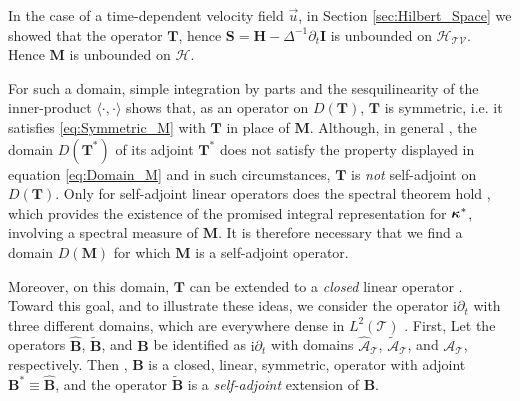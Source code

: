 \documentclass[11pt]{amsart}
\newcommand{\I}{\mathrm{i}}
\newcommand{\Mb}{\mathbf{M}}
\newcommand{\Tb}{\mathbf{T}}
\newcommand{\Hb}{\mathbf{H}}
\newcommand{\Ib}{\mathbf{I}}
\newcommand{\Sb}{\mathbf{S}}
\newcommand{\Bb}{\mathbf{B}}
\newcommand{\Tc}{\mathcal{T}}
\newcommand{\Vc}{\mathcal{V}}
\newcommand{\Hs}{\mathscr{H}}
\newcommand{\As}{\mathscr{A}}
\newcommand\bkappa{\mbox{\boldmath${\kappa}$}}
\begin{document}
In the case of a time-dependent velocity field $\vec{u}$, in Section
\ref{sec:Hilbert_Space} we showed that the operator $\Tb$, hence
$\Sb=\Hb-\Delta^{-1}\partial_t\Ib$ is unbounded on $\Hs_{\Tc\Vc}$.  Hence $\Mb$ is unbounded on $\Hs$. 




 
For such a domain, simple integration by parts and the sesquilinearity 
of the inner-product $\langle\cdot,\cdot\rangle$ shows that, as an operator on $D(\Tb)$,
$\Tb$ is symmetric, i.e. it satisfies \eqref{eq:Symmetric_M} with
$\Tb$ in place of $\Mb$. Although, in general \cite{Reed-1980}, the
domain $D(\Tb^*)$ of its adjoint $\Tb^*$ does not satisfy the property
displayed in equation \eqref{eq:Domain_M} and in such circumstances,
$\Tb$ is \emph{not} self-adjoint on $D(\Tb)$. Only for self-adjoint
linear operators does the spectral theorem hold \cite{Reed-1980},
which provides the existence of the promised integral representation
for $\bkappa^*$, involving a spectral measure of $\Mb$. It is therefore
necessary that we find a domain $D(\Mb)$ for which $\Mb$ is a
self-adjoint operator.   



Moreover, on this domain, $\Tb$ can be
extended to a \emph{closed} linear operator
\cite{Reed-1980,Stone:64}.
Toward this goal, and to illustrate these ideas, we consider the
operator $\I\partial_t$ with three different domains, which are everywhere
dense in $L^2(\Tc)$ \cite{Stone:64}. First,  Let the
operators $\hat{\Bb}$, $\tilde{\Bb}$, and $\Bb$ be identified as
$\I\partial_t$ with domains $\hat{\As}_{\Tc}$, $\tilde{\As}_{\Tc}$, and
$\As_{\Tc}$, respectively. Then \cite{Stone:64}, $\Bb$ is a closed,
linear, symmetric, operator with adjoint $\Bb^*\equiv\hat{\Bb}$, and the
operator $\tilde{\Bb}$ is a \emph{self-adjoint} extension of $\Bb$. 
\end{document}
